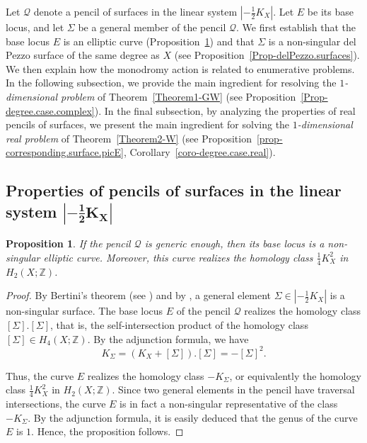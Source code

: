 \documentclass[10pt,a4paper]{article}
\numberwithin{equation}{section}
\theoremstyle{definition}
\theoremstyle{plain}
\newtheorem{proposition}[definition]{Proposition}
\theoremstyle{remark}
\newcommand{\Z}{\mathbb{Z}}
\begin{document}
Let $\mathcal{Q}$ denote a pencil of surfaces in the linear system $|-\frac{1}{2}K_X|$. Let $E$ be its base locus, and let  $\Sigma$ be a general member of the pencil $\mathcal{Q}$. We first establish that the base locus $E$ is an elliptic curve (Proposition~\ref{Prop-E.is.elliptic}) and that $\Sigma$ is a non-singular del Pezzo surface of the same degree as $X$ (see Proposition~\ref{Prop-delPezzo.surfaces}).  We then explain how the monodromy action is related to enumerative problems. In the following subsection, we provide the main ingredient for resolving the \textit{$1$-dimensional problem} of Theorem~\ref{Theorem1-GW} (see Proposition~\ref{Prop-degree.case.complex}). In the final subsection, by analyzing the properties of real pencils of surfaces, we present the main ingredient for solving the \textit{$1$-dimensional real  problem} of Theorem~\ref{Theorem2-W} (see Proposition~\ref{prop-corresponding.surface.picE}, Corollary~\ref{coro-degree.case.real}).

\subsection{Properties of pencils of surfaces in the linear system $\boldsymbol{|-\frac{1}{2}K_X|}$}

\begin{proposition} 
\label{Prop-E.is.elliptic}
 If the pencil $\mathcal{Q}$ is generic enough, then its base locus is a non-singular elliptic curve. Moreover, this curve realizes the homology class $\frac{1}{4}K^2_X$ in $H_2(X;\mathbb{Z})$.
\end{proposition}

\begin{proof}
 By Bertini's theorem (see \cite{griffiths1978principles}) and by \cite[Theorem 1.2]{vsokurov1980smoothness}, a general element $\Sigma \in |-\frac{1}{2}K_X|$ is a non-singular surface.  The base locus $E$ of the pencil $\mathcal{Q}$ realizes the homology class $[\Sigma].[\Sigma]$, that is, the self-intersection product of the homology class $[\Sigma]\in H_4(X;\Z)$. 
 By the adjunction formula, we have 
$$K_\Sigma =(K_X + [\Sigma] ).[\Sigma] = -[\Sigma]^2.$$

Thus, the curve $E$ realizes the homology class $-K_\Sigma$, or equivalently the homology class $\frac{1}{4}K^2_X$ in $H_2(X;\mathbb{Z})$. Since two general elements in the pencil have  traversal intersections, the curve  $E$ is in fact a non-singular representative of the class $-K_\Sigma$. By the adjunction formula, it is easily deduced that the genus of the curve $E$ is $1$. Hence, the proposition follows.
\end{proof}
\end{document}
